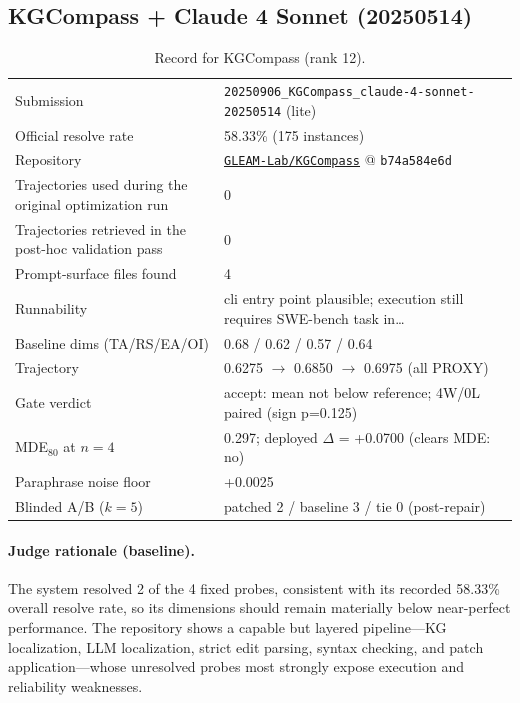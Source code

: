 \subsection{KGCompass + Claude 4 Sonnet (20250514)}
\label{app:agent12}
\begin{table}[H]\centering\scriptsize
\caption{Record for KGCompass (rank 12).}
\begin{tabular}{lp{8.2cm}}\toprule
Submission & \texttt{20250906\_\allowbreak{}KGCompass\_\allowbreak{}claude-4-sonnet-20250514} (lite) \\
Official resolve rate & 58.33\% (175 instances) \\
Repository & \href{https://github.com/GLEAM-Lab/KGCompass}{\texttt{GLEAM-Lab/KGCompass}} @ \texttt{b74a584e6d} \\
Trajectories used during the original optimization run & 0 \\
Trajectories retrieved in the post-hoc validation pass & 0 \\
Prompt-surface files found & 4 \\
Runnability & cli entry point plausible; execution still requires SWE-bench task in\ldots{} \\
Baseline dims (TA/RS/EA/OI) & 0.68 / 0.62 / 0.57 / 0.64 \\
Trajectory & 0.6275 $\to$ 0.6850 $\to$ 0.6975 (all PROXY) \\
Gate verdict & accept: mean not below reference; 4W/0L paired (sign p=0.125) \\
MDE$_{80}$ at $n{=}4$ & 0.297; deployed $\Delta$ = +0.0700 (clears MDE: no) \\
Paraphrase noise floor & +0.0025 \\
Blinded A/B ($k{=}5$) & patched 2 / baseline 3 / tie 0 (post-repair) \\
\bottomrule\end{tabular}\end{table}
\paragraph{Judge rationale (baseline).}
The system resolved 2 of the 4 fixed probes, consistent with its recorded 58.33\% overall resolve rate, so its dimensions should remain materially below near-perfect performance. The repository shows a capable but layered pipeline—KG localization, LLM localization, strict edit parsing, syntax checking, and patch application—whose unresolved probes most strongly expose execution and reliability weaknesses.
